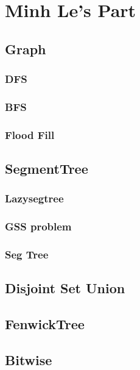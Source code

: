 \chapter{Minh Le's Part}

\section{Graph}
	\subsection{DFS}
	\subsection{BFS}
	\subsection{Flood Fill}

\section{SegmentTree}
	\subsection{Lazysegtree}
	\subsection{GSS problem}
	\subsection{Seg Tree}

\section{Disjoint Set Union}

\section{FenwickTree}

\section{Bitwise}

